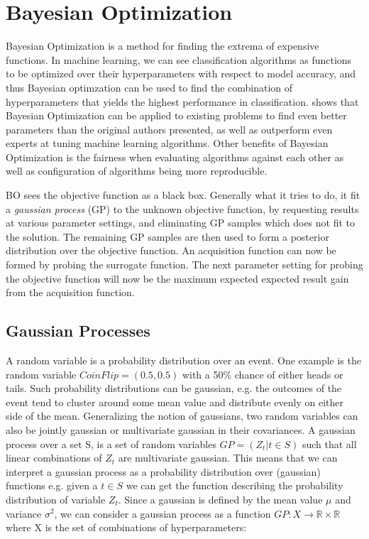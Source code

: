 \section{Bayesian Optimization}\label{sec:bayesian-optimization}
Bayesian Optimization is a method for finding the extrema of expensive functions. In machine learning, we can see classification algorithms as functions to be optimized over their hyperparameters with respect to model accuracy, and thus Bayesian optimzation can be used to find the combination of hyperparameters that yields the highest performance in classification. \citet{snoek2012practical} shows that Bayesian Optimization can be applied to existing problems to find even better parameters than the original authors presented, as well as outperform even experts at tuning machine learning algorithms. Other benefits of Bayesian Optimization is the fairness when evaluating algorithms against each other as well as configuration of algorithms being more reproducible.

BO sees the objective function as a black box. Generally what it tries to do, it fit a \emph{gaussian process} (GP) to the unknown objective function, by requesting results at various parameter settings, and eliminating GP samples which does not fit to the solution. The remaining GP samples are then used to form a posterior distribution over the objective function. An acquisition function can now be formed by probing the surrogate function. The next parameter setting for probing the objective function will now be the maximum expected expected result gain from the acquisition function.
\begin{algorithm}
\end{algorithm}
\subsection{Gaussian Processes}
A random variable is a probability distribution over an event. One example is the random variable $CoinFlip = (0.5, 0.5)$ with a 50\% chance of either heads or tails. Such probability distributions can be gaussian, e.g. the outcomes of the event tend to cluster around some mean value and distribute evenly on either side of the mean. Generalizing the notion of gaussians, two random variables can also be jointly gaussian or multivariate gaussian in their covariances. A gaussian process over a set S, is a set of random variables $GP = (Z_t | t \in S)$ such that all linear combinations of $Z_t$ are multivariate gaussian. This means that we can interpret a gaussian process as a probability distribution over (gaussian) functions e.g. given a $t \in S$ we can get the function describing the probability distribution of variable $Z_t$. Since a gaussian is defined by the mean value $\mu$ and variance $\sigma^2$, we can consider a gaussian process as a function $GP : X \rightarrow \mathbb{R} \times \mathbb{R}$ where X is the set of combinations of hyperparameters:

